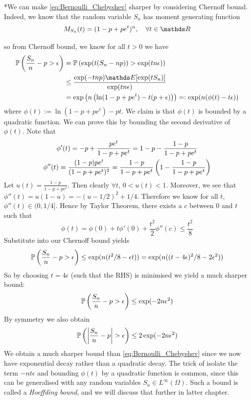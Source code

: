 \begin{unexaminable}
\begin{remark}
*We can make \eqref{eq:Bernoulli_Chebyshev} sharper by considering Chernoff bound. Indeed, we know that the random variable $S_n$ has moment generating function
\begin{equation}
    M_{S_n}(t) = (1-p+pe^t)^n, \quad \forall t \in \R
\end{equation}

so from Chernoff bound, we know for all $t>0$ we have
\begin{align*}
    \p\bracket{\frac{S_n}{n} - p > \epsilon} &= \p\bracket{\exp(t(S_n - np)) > \exp(tn\epsilon)} \\
    &\leq \frac{\exp(-tnp)\E[\exp(tS_n)]}{\exp(tn\epsilon)} \\
    &= \exp\bracket{n \bracket{\ln(1-p+pe^t) - t(p+\epsilon)}} =: \exp(n(\phi(t)-t\epsilon))
\end{align*}
where $\phi(t):= \ln(1-p+pe^t) - pt$. We claim is that $\phi(t)$ is bounded by a quadratic function. We can prove this by bounding the second derivative of $\phi(t)$. Note that
\begin{gather}
    \phi'(t) = -p + \frac{pe^t}{1-p+pe^t} = 1-p-\frac{1-p}{1-p+pe^t} \\
    \phi''(t) = \frac{(1-p)pe^t}{(1-p+pe^t)^2} = \frac{1-p}{1-p+pe^t}\left( 1-\frac{1-p}{1-p+pe^t} \right)
\end{gather}
Let $\displaystyle{u(t) = \frac{1-p}{1-p+pe^t}}$. Then clearly $\forall t, \, 0 < u(t) < 1$. Moreover, we see that $\phi''(t) = u(1-u) = -(u-1/2)^2 + 1/4$. Therefore we know for all $t$, $\phi''(t) \in (0,1/4]$. Hence by Taylor Theorem, there exists a $c$ between $0$ and $t$ such that
\begin{equation}
    \phi(t) = \phi(0) + t\phi'(0) + \frac{t^2}{2}\phi''(c) \leq \frac{t^2}{8} 
\end{equation}
Substitute into our Chernoff bound yields
\begin{equation}
    \mathbb{P}\left( \frac{S_n}{n} - p > \epsilon \right) \leq \exp(n(t^2/8 - \epsilon t)) = \exp(n((t-4\epsilon)^2/8 - 2\epsilon^2))
\end{equation} 
So by choosing $t = 4\epsilon$ (such that the RHS) is minimised we yield a much sharper bound:
\begin{equation}
    \mathbb{P}\left( \frac{S_n}{n} - p > \epsilon \right)  \leq \exp(-2n\epsilon^2)
\end{equation}
By symmetry we also obtain 
\begin{equation} \label{eq:Bernoulli_hoeffding}
    \mathbb{P}\left( \left| \frac{S_n}{n} - p \right| > \epsilon \right) \leq 2\exp(-2n\epsilon^2)
\end{equation}
We obtain a much sharper bound than \eqref{eq:Bernoulli_Chebyshev} since we now have exponential decay rather than a quadratic decay. The trick of isolate the term $-nt\epsilon$ and bounding $\phi(t)$ by a quadratic function is common, since this can be generalised with any random variables $S_n \in L^\infty(\Omega)$. Such a bound is called a \textit{Hoeffding bound}, and we will discuss that further in latter chapter.
\end{remark}
\end{unexaminable}

